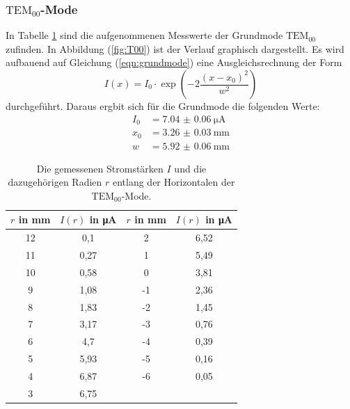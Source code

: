 \subsubsection{$\mathrm{TEM}_\mathrm{00}$-Mode}

In Tabelle \ref{tab:T00} sind die aufgenommenen Messwerte der Grundmode $\mathrm{TEM}_\mathrm{00}$ zufinden. In Abbildung (\ref{fig:T00}) ist der Verlauf graphisch dargestellt.
Es wird aufbauend auf Gleichung (\ref{eqn:grundmode}) eine Ausgleichsrechnung der Form
\begin{equation}
  I(x) = I_\mathrm{0} \cdot \exp\left(-2\frac{(x-x_\mathrm{0})^2}{w^2}\right)
\end{equation}
durchgeführt.
Daraus ergbit sich für die Grundmode die folgenden Werte:
\begin{align*}
I_\mathrm{0} &= \SI{7.04(6)}{\micro\ampere}\\
x_\mathrm{0} &= \SI{3.26(3)}{\milli\meter}\\
w &= \SI{5.92(6)}{\milli\meter}
\end{align*}

 \begin{table}
 	\centering
 	\caption{Die gemessenen Stromstärken $I$ und die dazugehörigen Radien $r$ entlang der Horizontalen der $\mathrm{TEM}_\mathrm{00}$-Mode.}
 	\label{tab:T00}
  \begin{tabular}{c c c c}
    \toprule
    $r$ in mm & $I(r)$ in \si{\micro\ampere} & $r$ in mm & $I(r)$ in \si{\micro\ampere} \\
    \midrule
    12 & 0,1  & 2  & 6,52 \\
    11 & 0,27 & 1  & 5,49 \\
    10 & 0,58 & 0  & 3,81 \\
     9 & 1,08 & -1 & 2,36 \\
     8 & 1,83 & -2 & 1,45 \\
     7 & 3,17 & -3 & 0,76 \\
     6 & 4,7  & -4 & 0,39 \\
     5 & 5,93 & -5 & 0,16 \\
     4 & 6,87 & -6 & 0,05 \\
     3 & 6,75 & & \\
    \bottomrule
  \end{tabular}
 \end{table}

